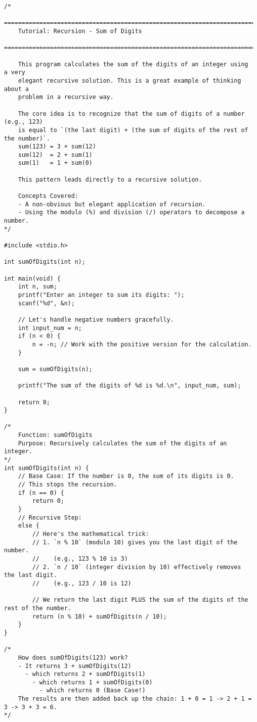 \documentclass[11pt]{book}
\begin{document}
\clearpage
\begin{verbatim}
/*
    ================================================================================
    Tutorial: Recursion - Sum of Digits
    ================================================================================

    This program calculates the sum of the digits of an integer using a very
    elegant recursive solution. This is a great example of thinking about a
    problem in a recursive way.

    The core idea is to recognize that the sum of digits of a number (e.g., 123)
    is equal to `(the last digit) + (the sum of digits of the rest of the number)`.
    sum(123) = 3 + sum(12)
    sum(12)  = 2 + sum(1)
    sum(1)   = 1 + sum(0)

    This pattern leads directly to a recursive solution.

    Concepts Covered:
    - A non-obvious but elegant application of recursion.
    - Using the modulo (%) and division (/) operators to decompose a number.
*/

#include <stdio.h>

int sumOfDigits(int n);

int main(void) {
    int n, sum;
    printf("Enter an integer to sum its digits: ");
    scanf("%d", &n);

    // Let's handle negative numbers gracefully.
    int input_num = n;
    if (n < 0) {
        n = -n; // Work with the positive version for the calculation.
    }

    sum = sumOfDigits(n);

    printf("The sum of the digits of %d is %d.\n", input_num, sum);

    return 0;
}

/*
    Function: sumOfDigits
    Purpose: Recursively calculates the sum of the digits of an integer.
*/
int sumOfDigits(int n) {
    // Base Case: If the number is 0, the sum of its digits is 0.
    // This stops the recursion.
    if (n == 0) {
        return 0;
    }
    // Recursive Step:
    else {
        // Here's the mathematical trick:
        // 1. `n % 10` (modulo 10) gives you the last digit of the number.
        //    (e.g., 123 % 10 is 3)
        // 2. `n / 10` (integer division by 10) effectively removes the last digit.
        //    (e.g., 123 / 10 is 12)

        // We return the last digit PLUS the sum of the digits of the rest of the number.
        return (n % 10) + sumOfDigits(n / 10);
    }
}

/*
    How does sumOfDigits(123) work?
    - It returns 3 + sumOfDigits(12)
      - which returns 2 + sumOfDigits(1)
        - which returns 1 + sumOfDigits(0)
          - which returns 0 (Base Case!)
    The results are then added back up the chain: 1 + 0 = 1 -> 2 + 1 = 3 -> 3 + 3 = 6.
*/

\end{verbatim}
\end{document}
